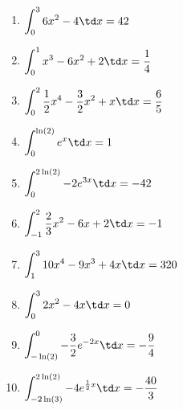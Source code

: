 \begin{Answer}[ref=integralRechnA2]\\
	\begin{enumerate}[label=\alph*)]
		\item \(\displaystyle\int_{0}^{3} 6x^2-4 \td x=42\)
		\item \(\displaystyle\int_{0}^{1} x^3-6x^2+2 \td x=\frac{1}{4}\)
		\item \(\displaystyle\int_{0}^{2} \frac{1}{2}x^4-\frac{3}{2}x^2+x \td x=\frac{6}{5}\)
		\item \(\displaystyle\int_{0}^{\ln(2)} e^x \td x=1\)
		\item \(\displaystyle\int_{0}^{2\ln(2)} -2e^{3x} \td x=-42\)
		\item \(\displaystyle\int_{-1}^{2} \frac{2}{3}x^2-6x+2 \td x=-1\)
		\item \(\displaystyle\int_{1}^{3} 10x^4-9x^3+4x \td x=320\)
		\item \(\displaystyle\int_{0}^{3} 2x^2-4x \td x=0\)
		\item \(\displaystyle\int_{-\ln(2)}^{0} -\frac{3}{2}e^{-2x} \td x=-\frac{9}{4}\)
		\item \(\displaystyle\int_{-2\ln(3)}^{2\ln(2)} -4e^{\frac{1}{2}x} \td x=-\frac{40}{3}\)
	\end{enumerate}
\end{Answer}